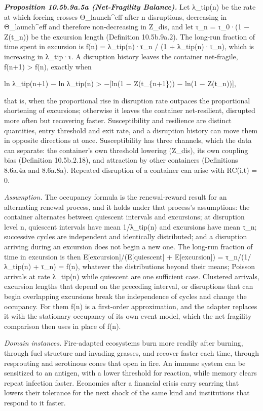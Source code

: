 \documentclass[
]{article}
\begin{document}
\emph{\textbf{Proposition 10.5b.9a.5a (Net-Fragility Balance).}} Let
λ\_tip(n) be the rate at which forcing crosses Θ\_launch\^{}eff after n
disruptions, decreasing in Θ\_launch\^{}eff and therefore non-decreasing
in Z\_dis, and let τ\_n = τ\_0·(1 − Z(t\_n)) be the excursion length
(Definition 10.5b.9a.2). The long-run fraction of time spent in
excursion is f(n) = λ\_tip(n)·τ\_n / (1 + λ\_tip(n)·τ\_n), which is
increasing in λ\_tip·τ. A disruption history leaves the container
net-fragile, f(n+1) \textgreater{} f(n), exactly when

ln λ\_tip(n+1) − ln λ\_tip(n) \textgreater{} −{[}ln(1 − Z(t\_\{n+1\})) −
ln(1 − Z(t\_n)){]},

that is, when the proportional rise in disruption rate outpaces the
proportional shortening of excursions; otherwise it leaves the container
net-resilient, disrupted more often but recovering faster.
Susceptibility and resilience are distinct quantities, entry threshold
and exit rate, and a disruption history can move them in opposite
directions at once. Susceptibility has three channels, which the data
can separate: the container's own threshold lowering (Z\_dis), its own
coupling bias (Definition 10.5b.2.18), and attraction by other
containers (Definitions 8.6a.4a and 8.6a.8a). Repeated disruption of a
container can arise with RC(i,t) = 0.

\emph{Assumption.} The occupancy formula is the renewal-reward result
for an alternating renewal process, and it holds under that process's
assumptions: the container alternates between quiescent intervals and
excursions; at disruption level n, quiescent intervals have mean
1/λ\_tip(n) and excursions have mean τ\_n; successive cycles are
independent and identically distributed; and a disruption arriving
during an excursion does not begin a new one. The long-run fraction of
time in excursion is then E{[}excursion{]}/(E{[}quiescent{]} +
E{[}excursion{]}) = τ\_n/(1/λ\_tip(n) + τ\_n) = f(n), whatever the
distributions beyond their means; Poisson arrivals at rate λ\_tip(n)
while quiescent are one sufficient case. Clustered arrivals, excursion
lengths that depend on the preceding interval, or disruptions that can
begin overlapping excursions break the independence of cycles and change
the occupancy. For them f(n) is a first-order approximation, and the
adapter replaces it with the stationary occupancy of its own event
model, which the net-fragility comparison then uses in place of f(n).

\emph{Domain instances.} Fire-adapted ecosystems burn more readily after
burning, through fuel structure and invading grasses, and recover faster
each time, through resprouting and serotinous cones that open in fire.
An immune system can be sensitized to an antigen, with a lower threshold
for reaction, while memory clears repeat infection faster. Economies
after a financial crisis carry scarring that lowers their tolerance for
the next shock of the same kind and institutions that respond to it
faster.
\end{document}
